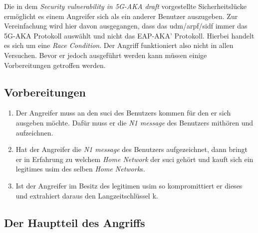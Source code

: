 Die in dem \textit{Security vulnerability in 5G-AKA draft} vorgestellte Sicherheitslücke ermöglicht es einem Angreifer sich als ein anderer Benutzer auszugeben. %
Zur Vereinfachung wird hier davon ausgegangen, dass das \gls{udm}/\gls{arpf}/\gls{sidf} immer das 5G-AKA Protokoll auswählt und nicht das EAP-AKA' Protokoll.
Hierbei handelt es sich um eine \textit{Race Condition}.
Der Angriff funktioniert also nicht in allen Versuchen.
Bevor er jedoch ausgeführt werden kann müssen einige Vorbereitungen getroffen werden.

\subsection{Vorbereitungen}

\begin{enumerate}
\item Der Angreifer muss an den \gls{suci} des Benutzers kommen für den er sich ausgeben möchte.
Dafür muss er die \textit{N1 message} des Benutzers mithören und aufzeichnen.

\item Hat der Angreifer die \textit{N1 message} des Benutzers aufgezeichnet, dann bringt er in Erfahrung zu welchem \textit{Home Network} der \gls{suci} gehört und kauft sich ein legitimes \gls{usim} des selben \textit{Home Network}s.

\item Ist der Angreifer im Besitz des legitimen \gls{usim} so kompromittiert er dieses und extrahiert daraus den Langzeitschlüssel \gls{k}.

\end{enumerate}

\subsection{Der Hauptteil des Angriffs}


